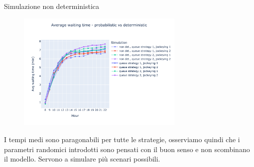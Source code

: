 \begin{frame}{Simulazione non deterministica}
	\begin{figure}[H]
		\centering
		\includegraphics[width=8cm]{"../report/images/results/avg_wt_prob.png"}
	\end{figure}
	I tempi medi sono paragonabili per tutte le strategie, osserviamo quindi che i parametri randomici introdotti sono pensati con il buon senso e non scombinano il modello. Servono a simulare più scenari possibili.
\end{frame}